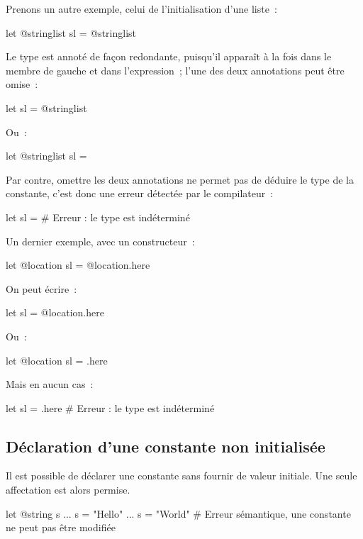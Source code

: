 Prenons un autre exemple, celui de l'initialisation d'une liste~:
\begin{galgas3}
let @stringlist sl = @stringlist {}
\end{galgas3}

Le type est annoté de façon redondante, puisqu'il apparaît à la fois dans le membre de gauche et dans l'expression~; l'une des deux annotations peut être omise~:
\begin{galgas3}
let sl = @stringlist {}
\end{galgas3}

Ou~:
\begin{galgas3}
let @stringlist sl = {}
\end{galgas3}

Par contre, omettre les deux annotations ne permet pas de déduire le type de la constante, c'est donc une erreur détectée par le compilateur~:
\begin{galgas3}
let sl = {} # Erreur : le type est indéterminé
\end{galgas3}

Un dernier exemple, avec un constructeur~:
\begin{galgas3}
let @location sl = @location.here
\end{galgas3}

On peut écrire~:
\begin{galgas3}
let sl = @location.here
\end{galgas3}

Ou~:
\begin{galgas3}
let @location sl = .here
\end{galgas3}

Mais en aucun cas~:
\begin{galgas3}
let sl = .here # Erreur : le type est indéterminé
\end{galgas3}


\subsection{Déclaration d'une constante non initialisée}

Il est possible de déclarer une constante sans fournir de valeur initiale. Une seule affectation est alors permise.

\begin{galgas3}
let @string s
...
s = "Hello"
...
s = "World" # Erreur sémantique, une constante ne peut pas être modifiée
\end{galgas3}

